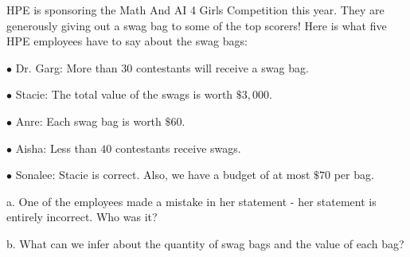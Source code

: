 HPE is sponsoring the Math And AI 4 Girls Competition this year. They are generously giving out a swag bag to some of the top scorers! Here is what five HPE employees have to say about the swag bags:



$\bullet$ Dr. Garg: More than $30$ contestants will receive a swag bag.

$\bullet$ Stacie: The total value of the swags is worth $\$3,000$.

$\bullet$ Anre: Each swag bag is worth $\$60$.

$\bullet$ Aisha: Less than $40$ contestants receive swags.

$\bullet$ Sonalee: Stacie is correct. Also, we have a budget of at most $\$70$ per bag.



a. One of the employees made a mistake in her statement - her statement is entirely incorrect. Who was it?

b. What can we infer about the quantity of swag bags and the value of each bag?
